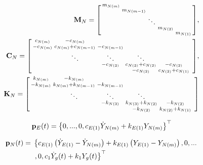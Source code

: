 \begin{equation}\label{eq:2-6}
\begin{aligned}
\mathbf{M}_{N} = \begin{bsmallmatrix} m_{N(m)}&&&&\\&m_{N(m-1)}&&&\\&&\ddots&&\\&&&m_{N(2)}&\\&&&&m_{N(1)} \end{bsmallmatrix},\\
\mathbf{C}_{N} = \begin{bsmallmatrix} c_{N(m)}&-c_{N(m)}&&&&\\-c_{N(m)}&c_{N(m)}+c_{N(m-1)}&-c_{N(m-1)}&&\\&\ddots&\ddots&\ddots&\\&&-c_{N(3)}&c_{N(3)}+c_{N(2)}&-c_{N(2)}\\&&&-c_{N(2)}&c_{N(2)}+c_{N(1)} \end{bsmallmatrix},\\
\mathbf{K}_{N} = \begin{bsmallmatrix} k_{N(m)}&-k_{N(m)}&&&&\\-k_{N(m)}&k_{N(m)}+k_{N(m-1)}&-k_{N(m-1)}&&\\&\ddots&\ddots&\ddots&\\&&-k_{N(3)}&k_{N(3)}+k_{N(2)}&-k_{N(2)}\\&&&-k_{N(2)}&k_{N(2)}+k_{N(1)} \end{bsmallmatrix}
\end{aligned}
\end{equation}

\begin{equation}\label{eq:2-7}
\mathbf{p}_{E}(t) = \left\{0,...,0,c_{E(1)}\dot{Y}_{N(m)}+k_{E(1)}Y_{N(m)}\right\}^{\top}
\end{equation}

\begin{equation}\label{eq:2-8}
\begin{aligned}
\mathbf{p}_{N}(t) ={}& \left\{c_{E(1)}\left(\dot{Y}_{E(1)}-\dot{Y}_{N(m)}\right)+k_{E(1)}\left(Y_{E(1)}-Y_{N(m)}\right),0,...\right. \\{}& \left. ,0,c_{1}\dot{Y}_{g}(t)+k_{1}Y_{g}(t)\right\}^{\top}
\end{aligned}
\end{equation}

